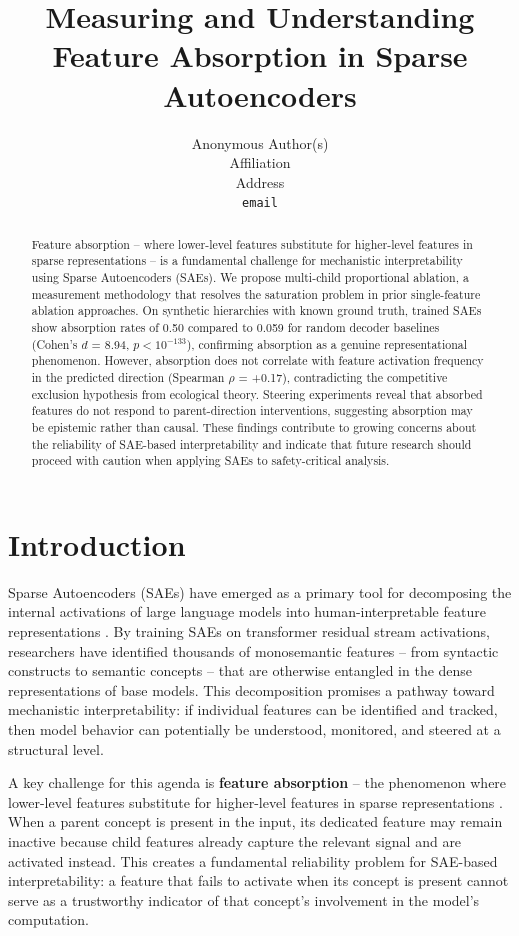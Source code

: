\documentclass{article}
\title{Measuring and Understanding Feature Absorption in Sparse Autoencoders}
\author{%
  Anonymous Author(s) \\
  Affiliation \\
  Address \\
  \texttt{email} \\
}
\begin{document}
\maketitle


\begin{abstract}
Feature absorption -- where lower-level features substitute for higher-level features in sparse representations -- is a fundamental challenge for mechanistic interpretability using Sparse Autoencoders (SAEs). We propose multi-child proportional ablation, a measurement methodology that resolves the saturation problem in prior single-feature ablation approaches. On synthetic hierarchies with known ground truth, trained SAEs show absorption rates of 0.50 compared to 0.059 for random decoder baselines (Cohen's $d$ = 8.94, $p < 10^{-133}$), confirming absorption as a genuine representational phenomenon. However, absorption does not correlate with feature activation frequency in the predicted direction (Spearman $\rho$ = +0.17), contradicting the competitive exclusion hypothesis from ecological theory. Steering experiments reveal that absorbed features do not respond to parent-direction interventions, suggesting absorption may be epistemic rather than causal. These findings contribute to growing concerns about the reliability of SAE-based interpretability and indicate that future research should proceed with caution when applying SAEs to safety-critical analysis.
\end{abstract}


\section{Introduction}

Sparse Autoencoders (SAEs) have emerged as a primary tool for decomposing the internal activations of large language models into human-interpretable feature representations \citep{bricken2023, templeton2024}. By training SAEs on transformer residual stream activations, researchers have identified thousands of monosemantic features -- from syntactic constructs to semantic concepts -- that are otherwise entangled in the dense representations of base models. This decomposition promises a pathway toward mechanistic interpretability: if individual features can be identified and tracked, then model behavior can potentially be understood, monitored, and steered at a structural level.

A key challenge for this agenda is \textbf{feature absorption} -- the phenomenon where lower-level features substitute for higher-level features in sparse representations \citep{chanin2024}. When a parent concept is present in the input, its dedicated feature may remain inactive because child features already capture the relevant signal and are activated instead. This creates a fundamental reliability problem for SAE-based interpretability: a feature that fails to activate when its concept is present cannot serve as a trustworthy indicator of that concept's involvement in the model's computation.
\end{document}
